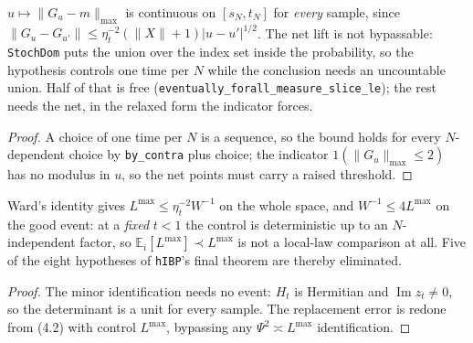 \begin{lemma}\label{lem:step1hyp}
  \leanok{}
  $u\mapsto\|G_u-m\|_{\max}$ is continuous on $[s_N,t_N]$ for \emph{every} sample, since
  $\|G_u-G_{u'}\|\le\eta_t^{-2}(\|X\|+1)|u-u'|^{1/2}$. The net lift is not bypassable: \texttt{StochDom}
  puts the union over the index set inside the probability, so the hypothesis controls one time per
  $N$ while the conclusion needs an uncountable union. Half of that is free
  (\texttt{eventually\_forall\_measure\_slice\_le}); the rest needs the net, in the relaxed form the
  indicator forces.
\end{lemma}
\begin{proof}\leanok
  A choice of one time per $N$ is a sequence, so the bound holds for every $N$-dependent choice by
  \texttt{by\_contra} plus choice; the indicator $1(\|G_u\|_{\max}\le2)$ has no modulus in $u$, so
  the net points must carry a raised threshold.
\end{proof}

\begin{lemma}\label{lem:condstable}
  \leanok{}
  Ward's identity gives $L^{\max}\le\eta_t^{-2}W^{-1}$ on the whole space, and $W^{-1}\le4L^{\max}$
  on the good event: at a \emph{fixed} $t<1$ the control is deterministic up to an $N$-independent
  factor, so $\mathbb E_i[L^{\max}]\prec L^{\max}$ is not a local-law comparison at all. Five of the
  eight hypotheses of \texttt{hIBP}'s final theorem are thereby eliminated.
\end{lemma}
\begin{proof}\leanok
  The minor identification needs no event: $H_t$ is Hermitian and $\operatorname{Im}z_t\ne0$, so the
  determinant is a unit for every sample. The replacement error is redone from (4.2) with control
  $L^{\max}$, bypassing any $\Psi^2\asymp L^{\max}$ identification.
\end{proof}

